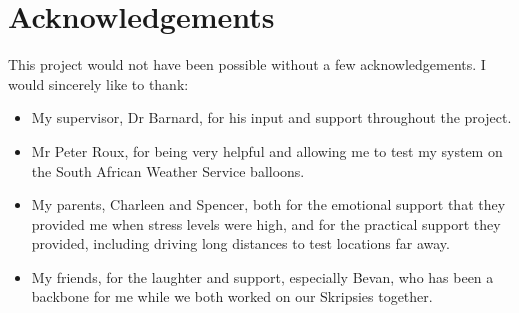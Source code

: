 \chapter*{Acknowledgements}
\makeatletter{}\makeatother

This project would not have been possible without a few acknowledgements. I would sincerely like to thank:
\begin{itemize}
    \item My supervisor, Dr Barnard, for his input and support throughout the project.
    \item Mr Peter Roux, for being very helpful and allowing me to test my system on the South African Weather Service balloons.
    \item My parents, Charleen and Spencer, both for the emotional support that they provided me when stress levels were high, and for the practical support they provided, including driving long distances to test locations far away.
    \item My friends, for the laughter and support, especially Bevan, who has been a backbone for me while we both worked on our Skripsies together.
\end{itemize}